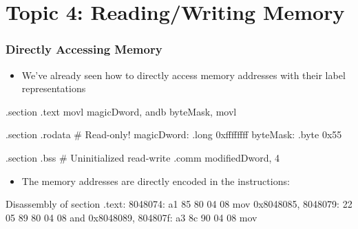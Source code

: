 \documentclass[11pt,xcolor=dvipsnames]{beamer}
\begin{document}
\section{Topic 4: Reading/Writing Memory}

\begin{frame}[fragile,t]
\frametitle{Directly Accessing Memory}
\begin{itemize}
  \item We've already seen how to directly access memory addresses with their label representations
\end{itemize}
\begin{gascode}
.section .text
movl magicDword, %
andb byteMask, %
movl %

.section .rodata          # Read-only!
magicDword: .long 0xffffffff
byteMask:   .byte 0x55

.section .bss             # Uninitialized read-write
.comm modifiedDword, 4
\end{gascode}
\begin{itemize}
  \item The memory addresses are directly encoded in the instructions:
\end{itemize}
\begin{customobjdumpcode}
Disassembly of section .text:
 8048074: a1 85 80 04 08        mov    0x8048085,%
 8048079: 22 05 89 80 04 08     and    0x8048089,%
 804807f: a3 8c 90 04 08        mov    %
\end{customobjdumpcode}
\end{frame}
\end{document}
